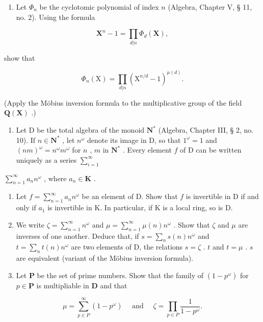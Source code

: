 \exercisesforappendix

\begin{enumerate}
\def\labelenumi{\arabic{enumi}.}
\tightlist
\item
  Let \(\Phi_n\) be the cyclotomic polynomial of index \(n\) (Algebra, Chapter V, § 11, no. 2). Using the formula
\end{enumerate}

\[
\mathbf {X} ^ {n} - 1 = \prod_ {d | n} \Phi_ {d} (\mathbf {X}),
\]

show that

\[
\Phi_ {n} (\mathrm{X}) = \prod_ {d | n} \left(\mathrm{X} ^ {n / d} - 1\right) ^ {\mu (d)}.
\]

(Apply the Möbius inversion formula to the multiplicative group of the field \(\mathbf{Q}(\mathbf{X})\) .)

\begin{enumerate}
\def\labelenumi{\arabic{enumi}.}
\setcounter{enumi}{1}
\tightlist
\item
  Let D be the total algebra of the monoid \(\mathbf{N}^*\) (Algebra, Chapter III, § 2, no. 10). If \(n \in \mathbf{N}^*\) , let \(n^\omega\) denote its image in D, so that \(1^\omega = 1\) and \((nm)^\omega = n^\omega m^\omega\) for \(n\) , \(m\) in \(\mathbf{N}^*\) . Every element \(f\) of D can be written uniquely as a series \(\sum_{i=1}^{\infty}\)
\end{enumerate}

\(\sum_{n=1}^{\infty} a_n n^\omega\) , where \(a_n \in \mathbf{K}\) .

\begin{enumerate}
\def\labelenumi{(\alph{enumi})}
\item
  Let \(f = \sum_{n=1}^{\infty} a_n n^\omega\) be an element of D. Show that \(f\) is invertible in D if and only if \(a_1\) is invertible in K. In particular, if K is a local ring, so is D.
\item
  We write \(\zeta = \sum_{n=1}^{\infty} n^{\omega}\) and \(\mu = \sum_{n=1}^{\infty} \mu(n)n^{\omega}\) . Show that \(\zeta\) and \(\mu\) are inverses of one another. Deduce that, if \(s = \sum_{n} s(n)n^{\omega}\) and \(t = \sum_{n} t(n)n^{\omega}\) are two elements of D, the relations \(s = \zeta\) . \(t\) and \(t = \mu\) . \(s\) are equivalent (variant of the Möbius inversion formula).
\item
  Let \(\mathbf{P}\) be the set of prime numbers. Show that the family of \((1 - p^{\omega})\) for \(p\in \mathbf{P}\) is multipliable in \(\mathbf{D}\) and that
\end{enumerate}

\[
\mu = \sum_ {p \in P} ^ {\infty} (1 - p ^ {\omega}) \quad \text { and } \quad \zeta = \prod_ {p \in P} \frac {1}{1 - p ^ {\omega}}.
\]


